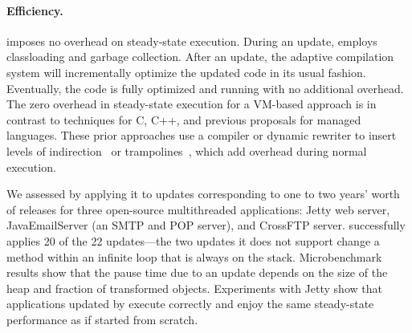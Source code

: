 \paragraph{Efficiency.}
\JV imposes no overhead on steady-state execution. During an update,
\JV employs
classloading and garbage collection. After an
update, the adaptive compilation system will incrementally optimize the
updated code in its usual fashion.  Eventually, the code is fully optimized
and running with no additional overhead.  The zero overhead in steady-state
execution for a VM-based approach is in contrast to \USD techniques for C,
C++, and previous proposals for managed languages. These prior approaches use a compiler or dynamic rewriter to insert
levels of indirection~\cite{neamtiu06dsu, orso:java} or
trampolines~\cite{chen06vee,chen:icse07,altekar05opus,ksplice}, which add
overhead during normal execution.

We assessed \JV by applying it to updates corresponding to one to two years'
worth of releases for three open-source multithreaded applications: Jetty
web server, JavaEmailServer (an SMTP and POP server), and CrossFTP server.
\JV successfully applies 20 of the 22 updates---the two
updates it does not support change a method within an infinite loop that is
always on the stack.  Microbenchmark results show that the pause time due
to an update depends on the size of the heap and fraction of transformed
objects.  Experiments with Jetty show that applications updated by \JV
execute correctly and
enjoy the same steady-state performance as if started from scratch.

